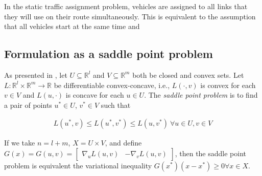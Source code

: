 
In the static traffic assignment problem, vehicles are assigned to all links that they will use on their route simultaneously. This is equivalent to the assumption that all vehicles start at the same time and 

\subsection{Formulation as a saddle point problem}

As presented in \citet{konnov2007equilibrium}, let $U\subseteq \mathbb{R}^l$ and $V\subseteq \mathbb{R}^m$ both be closed and convex sets. 
Let $L:\mathbb{R}^l\times\mathbb{R}^m \to \mathbb{R}$ be differentiable convex-concave, i.e., $L(\cdot, v)$ is convex for each $v\in V$ and $L(u, \cdot)$ is concave for each $u\in U$.
The \textit{saddle point problem} is to find a pair of points $u^*\in U$, $v^*\in V$ such that

\begin{align}
    L(u^*, v) \leq L(u^*, v^*) \leq L(u, v^*)\ \forall u \in U, v\in V
\end{align}

If we take $n=l+m$, $X= U\times V$, and define $G(x)=G(u, v) = \begin{bmatrix}\nabla_u L(u, v) & -\nabla_v L(u, v)\end{bmatrix}$, then the saddle point problem is equivalent the variational inequality $G(x^*)(x-x^*)\geq 0 \forall x\in X$.
